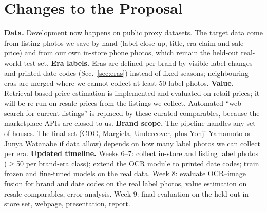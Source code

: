 \section{Changes to the Proposal}
\label{sec:changes}
\textbf{Data.} Development now happens on public proxy datasets. The target data come from listing
photos we save by hand (label close-up, title, era claim and sale price) and from our own in-store
phone photos, which remain the held-out real-world test set.
\textbf{Era labels.} Eras are defined per brand by visible label changes and printed date codes
(Sec.~\ref{sec:eras}) instead of fixed seasons; neighbouring eras are merged where we cannot collect
at least 50 label photos.
\textbf{Value.} Retrieval-based price estimation is implemented and evaluated on retail prices; it
will be re-run on resale prices from the listings we collect. Automated ``web search for current
listings'' is replaced by these curated comparables, because the marketplace APIs are closed to us.
\textbf{Brand scope.} The pipeline handles any set of houses. The final set (CDG, Margiela,
Undercover, plus Yohji Yamamoto or Junya Watanabe if data allow) depends on how many label photos we
can collect per era.
\textbf{Updated timeline.} Weeks 6--7: collect in-store and listing label photos ($\geq$50 per
brand-era class); extend the OCR module to printed date codes; train frozen and fine-tuned models on
the real data. Week 8: evaluate OCR--image fusion for brand and date codes on the real label photos, value
estimation on resale comparables, error analysis. Week 9:
final evaluation on the held-out in-store set, webpage, presentation, report.
